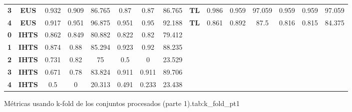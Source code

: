 {{\begin{tabular}{c|c|cccccc|ccccccc}
\textbf{3} & \textbf{EUS} & 0.932 & 0.909 & 86.765 & 0.87  & 0.87  & 86.765 & \multicolumn{1}{c|}{\textbf{TL}} & 0.986 & 0.959 & 97.059 & 0.959 & 0.959 & 97.059 \\
\textbf{4} & \textbf{EUS} & 0.917 & 0.951 & 96.875 & 0.951 & 0.95  & 92.188 & \multicolumn{1}{c|}{\textbf{TL}} & 0.861 & 0.892 & 87.5  & 0.816 & 0.815 & 84.375 \\
\textbf{0} & \textbf{IHTS} & 0.862 & 0.849 & 80.882 & 0.822 & 0.82  & 79.412 &       &       &       &       &       &       &  \\
\textbf{1} & \textbf{IHTS} & 0.874 & 0.88  & 85.294 & 0.923 & 0.92  & 88.235 &       &       &       &       &       &       &  \\
\textbf{2} & \textbf{IHTS} & 0.731 & 0.82  & 75    & 0.5   & 0     & 23.529 &       &       &       &       &       &       &  \\
\textbf{3} & \textbf{IHTS} & 0.671 & 0.78  & 83.824 & 0.911 & 0.911 & 89.706 &       &       &       &       &       &       &  \\
\textbf{4} & \textbf{IHTS} & 0.5   & 0     & 20.313 & 0.491 & 0.233 & 23.438 &       &       &       &       &       &       &  \\
\end{tabular}}}{Métricas usando k-fold de los conjuntos procesados (parte 1).}{tab:k_fold_pt1}

